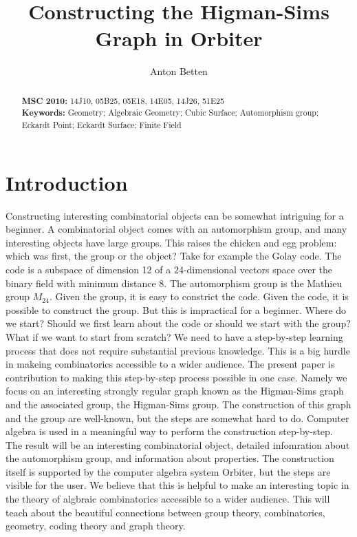 \documentclass[10pt]{article}
\title{Constructing the Higman-Sims Graph in Orbiter}
\author{Anton Betten}
\begin{document}

\setTBstruts


\maketitle




\begin{abstract}
{\bf MSC 2010:} 14J10, 05B25, 05E18, 14E05, 14J26, 51E25 \\
{\bf Keywords:} 
Geometry; Algebraic Geometry; Cubic Surface; Automorphism group; Eckardt Point; Eckardt Surface; Finite Field
\end{abstract}








\section{Introduction}


Constructing interesting combinatorial objects can be somewhat intriguing for a beginner. 
A combinatorial object comes with an automorphism group, and many interesting objects have large groups. This raises the chicken and egg problem: which was first, the group or the object? 
Take for example the Golay code. The code is a subspace of dimension 12 of a 24-dimensional vectors space over the binary field with minimum distance 8. 
The automorphism group is the Mathieu group $M_{24}$. Given the group, it is easy to constrict the code. Given the code, it is possible to construct the group. But this is impractical for 
a beginner. Where do we start? 
Should we first learn about the code or should we start with the group? 
What if we want to start from scratch? We need to have a step-by-step learning process 
that does not require substantial previous knowledge. This is a big hurdle in makeing combinatorics accessible to a wider audience. The present paper is  contribution to 
making this step-by-step process possible in one case. Namely we focus on an interesting 
strongly regular graph known as the Higman-Sims graph and the associated group, the Higman-Sims group.
The construction of this graph and the group are well-known, but the steps are somewhat hard to do. 
Computer algebra is used in a meaningful way to 
perform the construction step-by-step. The result will be an interesting combinatorial object, 
detailed infomration about the automorphism group, and information about properties. 
The construction itself is supported by the computer algebra system Orbiter, but the steps are visible for the user. We believe that this is helpful to make an interesting topic in the theory of algbraic combinatorics accessible to a wider audience. 
This will teach about the beautiful connections between group theory, 
combinatorics, geometry, coding theory and graph theory. 
\end{document}
